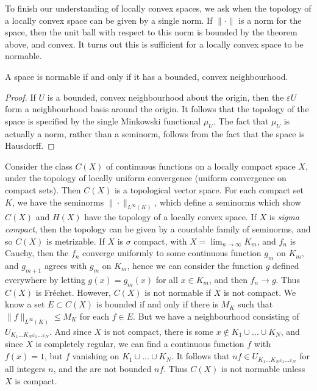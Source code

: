 To finish our understanding of locally convex spaces, we ask when the topology of a locally convex space can be given by a single norm. If $\| \cdot \|$ is a norm for the space, then the unit ball with respect to this norm is bounded by the theorem above, and convex. It turns out this is sufficient for a locally convex space to be normable.

\begin{theorem}
    A space is normable if and only if it has a bounded, convex neighbourhood.
\end{theorem}
\begin{proof}
    If $U$ is a bounded, convex neighbourhood about the origin, then the $\varepsilon U$ form a neighbourhood basis around the origin. It follows that the topology of the space is specified by the single Minkowski functional $\mu_U$. The fact that $\mu_U$ is actually a norm, rather than a seminorm, follows from the fact that the space is Hausdorff.
\end{proof}

\begin{example}
    Consider the class $C(X)$ of continuous functions on a locally compact space $X$, under the topology of locally uniform convergence (uniform convergence on compact sets). Then $C(X)$ is a topological vector space. For each compact set $K$, we have the seminorms $\| \cdot \|_{L^\infty(K)}$, which define a seminorms which show $C(X)$ and $H(X)$ have the topology of a locally convex space. If $X$ is {\it sigma compact}, then the topology can be given by a countable family of seminorms, and so $C(X)$ is metrizable. If $X$ is $\sigma$ compact, with $X = \lim_{n \to \infty} K_m$, and $f_n$ is Cauchy, then the $f_n$ converge uniformly to some continuous function $g_m$ on $K_m$, and $g_{m+1}$ agrees with $g_m$ on $K_m$, hence we can consider the function $g$ defined everywhere by letting $g(x) = g_m(x)$ for all $x \in K_m$, and then $f_n \to g$. Thus $C(X)$ is Fr\'{e}chet. However, $C(X)$ is not normable if $X$ is not compact. We know a set $E \subset C(X)$ is bounded if and only if there is $M_K$ such that $\| f \|_{L^\infty(K)} \leq M_K$ for each $f \in E$. But we have a neighbourhood consisting of $U_{K_1 \dots K_N \varepsilon_1 \dots \varepsilon_N}$. And since $X$ is not compact, there is some $x \not \in K_1 \cup \dots \cup K_N$, and since $X$ is completely regular, we can find a continuous function $f$ with $f(x) = 1$, but $f$ vanishing on $K_1 \cup \dots \cup K_N$. It follows that $nf \in U_{K_1 \dots K_N \varepsilon_1 \dots \varepsilon_N}$ for all integers $n$, and the are not bounded $nf$. Thus $C(X)$ is not normable unless $X$ is compact.
\end{example}

